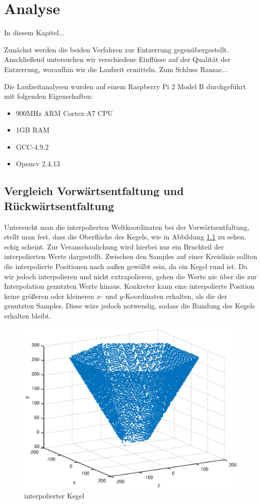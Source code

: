 \chapter{Analyse}
\label{ch:analysis}
In diesem Kapitel...

Zunächst werden die beiden Verfahren zur Entzerrung gegenübergestellt. Anschließend untersuchen wir verschiedene Einflüsse auf der Qualität der Entzerrung, woraufhin wir die Laufzeit ermitteln. 
Zum Schluss Ransac...

Die Laufzeitanalysen wurden auf einem Raspberry Pi 2 Model B durchgeführt mit folgenden Eigenschaften:
\begin{itemize}
	\item 900MHz ARM Cortex-A7 CPU
	\item 1GB RAM
	\item GCC-4.9.2
	\item Opencv 2.4.13
\end{itemize}


\section{Vergleich Vorwärtsentfaltung und Rückwärtsentfaltung}
Untersucht man die interpolierten Weltkoordinaten bei der Vorwärtsentfaltung, stellt man fest, dass die Oberfläche des Kegels,  wie in Abbildung \ref{fig:3DInterpol} zu sehen, eckig scheint. Zur Veranschaulichung wird hierbei nur ein Bruchteil der interpolierten Werte dargestellt. Zwischen den Samples auf einer Kreislinie sollten die interpolierte Positionen nach außen gewölbt sein, da ein Kegel rund ist. Da wir jedoch interpolieren und nicht extrapolieren, gehen die Werte nie über die zur Interpolation genutzten Werte hinaus. Konkreter kann eine interpolierte Position keine größeren oder kleineren $x$- und $y$-Koordinaten erhalten, als die der genutzten Samples. Diese wäre jedoch notwendig, sodass die Rundung des Kegels erhalten bleibt.

\begin{figure}[!htb]
	\centering
	\includegraphics[scale=.7]{images/3d_interpol.eps}
	\caption{interpolierter Kegel}
	\label{fig:3DInterpol}
\end{figure}

